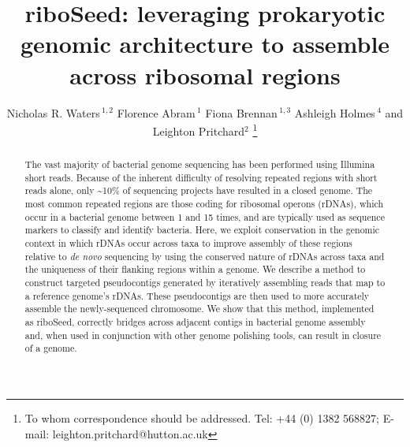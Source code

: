 \documentclass[a4,center,fleqn]{NAR}
\begin{document}
\title{riboSeed: leveraging prokaryotic genomic architecture to assemble across ribosomal regions}

\author{%
  Nicholas R. Waters\,$^{1,2}$
  Florence Abram\,$^{1}$
  Fiona Brennan\,$^{1,3}$
  Ashleigh Holmes\,$^{4}$
  and Leighton Pritchard$^{2}$
  \footnote{To whom correspondence should be addressed.
      Tel: +44 (0) 1382 568827; E-mail: leighton.pritchard@hutton.ac.uk
  }
}
\address{
  $^{1}$Department of Microbiology, School of Natural Sciences, National University of Ireland, Galway, Ireland \\
  $^{2}$Information and Computational Sciences, James Hutton Institute, Invergowrie, Dundee DD2 5DA, Scotland\\
  $^{3}$Soil and Environmental Microbiology, Environmental Research Centre, Teagasc, Johnstown Castle, Wexford, Ireland\\
  $^{4}$Cell and Molecular Sciences, James Hutton Institute, Invergowrie, Dundee DD2 5DA, Scotland\\
}


\maketitle

\begin{abstract}
The vast majority of bacterial genome sequencing has been performed using Illumina short reads. Because of the inherent difficulty of resolving repeated regions with short reads alone, only \textasciitilde10\% of sequencing projects have resulted in a closed genome. The most common repeated regions are those coding for ribosomal operons (rDNAs), which occur in a bacterial genome between 1 and 15 times, and are typically used as sequence markers to classify and identify bacteria. Here, we exploit conservation in the genomic context in which rDNAs occur across taxa to improve assembly of these regions relative to \textit{de novo} sequencing by using the conserved nature of rDNAs across taxa and the uniqueness of their flanking regions within a genome. We describe a method to construct targeted pseudocontigs generated by iteratively assembling reads that map to a reference genome's rDNAs. These pseudocontigs are then used to more accurately assemble the newly-sequenced chromosome. We show that this method, implemented as riboSeed, correctly bridges across adjacent contigs in bacterial genome assembly and, when used in conjunction with other genome polishing tools, can result in closure of a genome.
\end{abstract}
\end{document}
